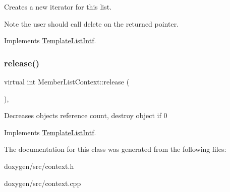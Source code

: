 Creates a new iterator for this list. \begin{DoxyNote}{Note}
the user should call delete on the returned pointer. 
\end{DoxyNote}


Implements \mbox{\hyperlink{class_template_list_intf_a56b82384db24c3e121076a1da046d378}{Template\+List\+Intf}}.

\mbox{\label{class_member_list_context_ada9f462753c6425d2912cd4cb02d4285}} 
\subsubsection{\texorpdfstring{release()}{release()}}
{\footnotesize\ttfamily virtual int Member\+List\+Context\+::release (\begin{DoxyParamCaption}{ }\end{DoxyParamCaption})\hspace{0.3cm}{\ttfamily [inline]}, {\ttfamily [virtual]}}

Decreases object\textquotesingle{}s reference count, destroy object if 0 

Implements \mbox{\hyperlink{class_template_list_intf_a0c53169c740c09dac47efc62bbe39674}{Template\+List\+Intf}}.



The documentation for this class was generated from the following files\+:\begin{DoxyCompactItemize}
\item 
doxygen/src/context.\+h\item 
doxygen/src/context.\+cpp\end{DoxyCompactItemize}
